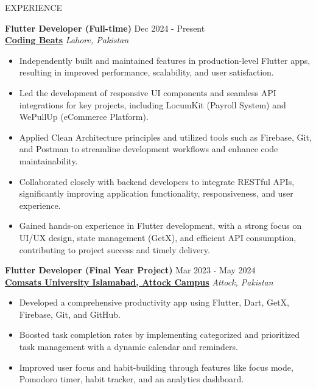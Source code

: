 \documentclass{resume}
\begin{document}
\begin{rSection}{EXPERIENCE}

\textbf{Flutter Developer (Full-time)} \hfill Dec 2024 - Present\\
\textbf{\href{https://www.linkedin.com/company/codingbeats}{Coding Beats}} \hfill \textit{Lahore, Pakistan}
 \begin{itemize}
    \itemsep -5pt {} 
\item Independently built and maintained features in production-level Flutter apps, resulting in improved performance, scalability, and user satisfaction.
\item Led the development of responsive UI components and seamless API integrations for key projects, including LocumKit (Payroll System) and WePullUp (eCommerce Platform).
\item Applied Clean Architecture principles and utilized tools such as Firebase, Git, and Postman to streamline development workflows and enhance code maintainability.
\item Collaborated closely with backend developers to integrate RESTful APIs, significantly improving application functionality, responsiveness, and user experience.
\item Gained hands-on experience in Flutter development, with a strong focus on UI/UX design, state management (GetX), and efficient API consumption, contributing to project success and timely delivery.
 \end{itemize}

\textbf{Flutter Developer (Final Year Project)} \hfill Mar 2023 - May 2024\\
\textbf{\href{https://www.linkedin.com/company/comsats-university-islamabad-attock-campus/}{Comsats University Islamabad, Attock Campus}} \hfill \textit{Attock, Pakistan}
 \begin{itemize}
    \itemsep -5pt {} 
\item Developed a comprehensive productivity app using Flutter, Dart, GetX, Firebase, Git, and GitHub.
\item Boosted task completion rates by implementing categorized and prioritized task management with a dynamic calendar and reminders.
\item Improved user focus and habit-building through features like focus mode, Pomodoro timer, habit tracker, and an analytics dashboard.
 \end{itemize}

\end{rSection} 
\end{document}
